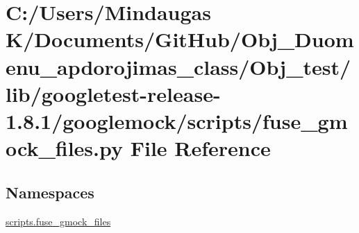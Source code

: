 \hypertarget{_obj__test_2lib_2googletest-release-1_88_81_2googlemock_2scripts_2fuse__gmock__files_8py}{}\section{C\+:/\+Users/\+Mindaugas K/\+Documents/\+Git\+Hub/\+Obj\+\_\+\+Duomenu\+\_\+apdorojimas\+\_\+class/\+Obj\+\_\+test/lib/googletest-\/release-\/1.8.1/googlemock/scripts/fuse\+\_\+gmock\+\_\+files.py File Reference}
\label{_obj__test_2lib_2googletest-release-1_88_81_2googlemock_2scripts_2fuse__gmock__files_8py}
\subsection*{Namespaces}
\begin{DoxyCompactItemize}
\item 
 \mbox{\hyperlink{namespacescripts_1_1fuse__gmock__files}{scripts.\+fuse\+\_\+gmock\+\_\+files}}
\end{DoxyCompactItemize}
